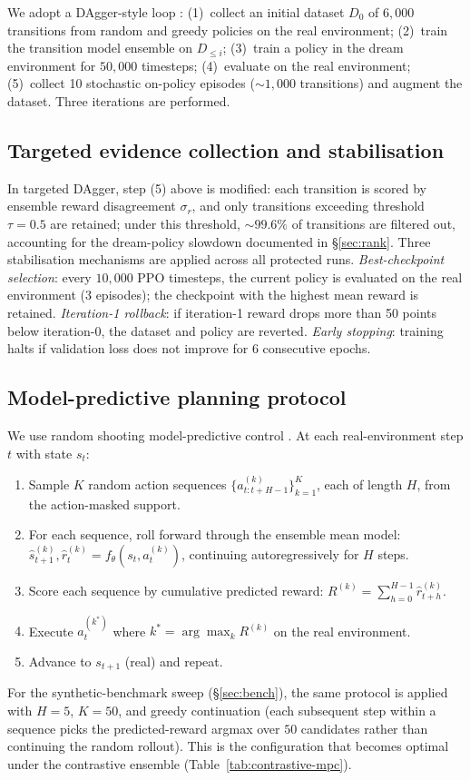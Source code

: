 \documentclass[11pt]{article}
\begin{document}
We adopt a DAgger-style loop \citep{ross2011reduction}: (1)~collect an initial dataset $D_0$ of $6{,}000$ transitions from random and greedy policies on the real environment; (2)~train the transition model ensemble on $D_{\leq i}$; (3)~train a policy in the dream environment for $50{,}000$ timesteps; (4)~evaluate on the real environment; (5)~collect 10 stochastic on-policy episodes ($\sim$$1{,}000$ transitions) and augment the dataset. Three iterations are performed.

\subsection*{Targeted evidence collection and stabilisation}

In targeted DAgger, step (5) above is modified: each transition is scored by ensemble reward disagreement $\sigma_r$, and only transitions exceeding threshold $\tau = 0.5$ are retained; under this threshold, $\sim$$99.6\%$ of transitions are filtered out, accounting for the dream-policy slowdown documented in \S\ref{sec:rank}. Three stabilisation mechanisms are applied across all protected runs. \emph{Best-checkpoint selection}: every $10{,}000$ PPO timesteps, the current policy is evaluated on the real environment (3 episodes); the checkpoint with the highest mean reward is retained. \emph{Iteration-1 rollback}: if iteration-1 reward drops more than 50 points below iteration-0, the dataset and policy are reverted. \emph{Early stopping}: training halts if validation loss does not improve for 6 consecutive epochs.

\subsection*{Model-predictive planning protocol}\label{sec:methods-mpc}

We use random shooting model-predictive control \citep{garcia1989model,williams2017model,rubinstein1999cross}. At each real-environment step $t$ with state $s_t$:
\begin{enumerate}
\item Sample $K$ random action sequences $\{a^{(k)}_{t:t+H-1}\}_{k=1}^K$, each of length $H$, from the action-masked support.
\item For each sequence, roll forward through the ensemble mean model: $\hat{s}^{(k)}_{t+1}, \hat{r}^{(k)}_t = f_\theta(s_t, a^{(k)}_t)$, continuing autoregressively for $H$ steps.
\item Score each sequence by cumulative predicted reward: $R^{(k)} = \sum_{h=0}^{H-1} \hat{r}^{(k)}_{t+h}$.
\item Execute $a^{(k^*)}_{t}$ where $k^* = \arg\max_k R^{(k)}$ on the real environment.
\item Advance to $s_{t+1}$ (real) and repeat.
\end{enumerate}
For the synthetic-benchmark sweep (\S\ref{sec:bench}), the same protocol is applied with $H{=}5$, $K{=}50$, and greedy continuation (each subsequent step within a sequence picks the predicted-reward argmax over $50$ candidates rather than continuing the random rollout). This is the configuration that becomes optimal under the contrastive ensemble (Table~\ref{tab:contrastive-mpc}).
\end{document}
